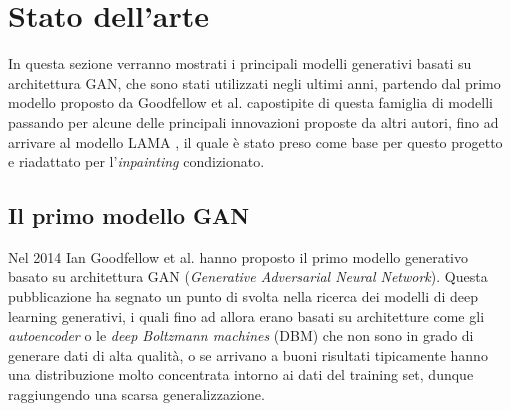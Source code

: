 \chapter{Stato dell'arte}

In questa sezione verranno mostrati i principali modelli generativi basati su architettura GAN, che sono stati utilizzati negli ultimi anni, partendo dal primo modello proposto da Goodfellow et al. \cite{goodfellow2014generative} capostipite di questa famiglia di modelli passando per alcune delle principali innovazioni proposte da altri autori, fino ad arrivare al modello LAMA \cite{suvorov2021resolutionrobust}, il quale è stato preso come base per questo progetto e riadattato per l'\textit{inpainting} condizionato. 

\section{Il primo modello GAN}
Nel 2014 Ian Goodfellow et al. \cite{goodfellow2014generative} hanno proposto il primo modello generativo basato su architettura GAN (\textit{Generative Adversarial Neural Network}).
Questa pubblicazione ha segnato un punto di svolta nella ricerca dei modelli di deep learning generativi, i quali fino ad allora erano
basati su architetture come gli \textit{autoencoder} o le \textit{deep Boltzmann machines} (DBM) che non sono in grado di generare dati di alta qualità,
o se arrivano a buoni risultati tipicamente hanno una distribuzione molto concentrata intorno ai dati del training set, dunque raggiungendo una scarsa generalizzazione.

